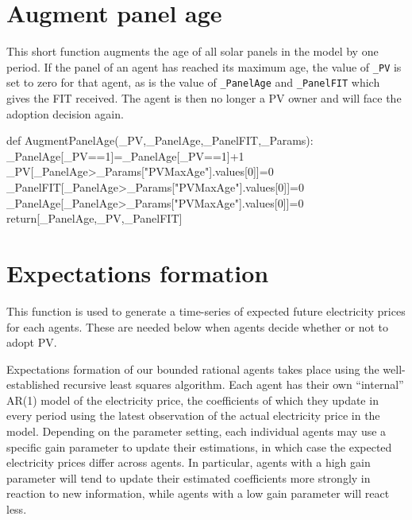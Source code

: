 \documentclass[
  letterpaper,
  DIV=11,
  numbers=noendperiod]{scrartcl}
\newenvironment{Shaded}{\begin{snugshade}}{\end{snugshade}}
\newcommand{\ControlFlowTok}[1]{\textcolor[rgb]{0.00,0.23,0.31}{#1}}
\newcommand{\DecValTok}[1]{\textcolor[rgb]{0.68,0.00,0.00}{#1}}
\newcommand{\KeywordTok}[1]{\textcolor[rgb]{0.00,0.23,0.31}{#1}}
\newcommand{\NormalTok}[1]{\textcolor[rgb]{0.00,0.23,0.31}{#1}}
\newcommand{\OperatorTok}[1]{\textcolor[rgb]{0.37,0.37,0.37}{#1}}
\newcommand{\StringTok}[1]{\textcolor[rgb]{0.13,0.47,0.30}{#1}}
\begin{document}
\hypertarget{augment-panel-age}{%
\section{Augment panel age}\label{augment-panel-age}}

This short function augments the age of all solar panels in the model by
one period. If the panel of an agent has reached its maximum age, the
value of \texttt{\_PV} is set to zero for that agent, as is the value of
\texttt{\_PanelAge} and \texttt{\_PanelFIT} which gives the FIT
received. The agent is then no longer a PV owner and will face the
adoption decision again.

\begin{Shaded}
\begin{Highlighting}[]
\KeywordTok{def}\NormalTok{ AugmentPanelAge(\_PV,\_PanelAge,\_PanelFIT,\_Params):}
\NormalTok{    \_PanelAge[\_PV}\OperatorTok{==}\DecValTok{1}\NormalTok{]}\OperatorTok{=}\NormalTok{\_PanelAge[\_PV}\OperatorTok{==}\DecValTok{1}\NormalTok{]}\OperatorTok{+}\DecValTok{1}
\NormalTok{    \_PV[\_PanelAge}\OperatorTok{\textgreater{}}\NormalTok{\_Params[}\StringTok{"PVMaxAge"}\NormalTok{].values[}\DecValTok{0}\NormalTok{]]}\OperatorTok{=}\DecValTok{0}
\NormalTok{    \_PanelFIT[\_PanelAge}\OperatorTok{\textgreater{}}\NormalTok{\_Params[}\StringTok{"PVMaxAge"}\NormalTok{].values[}\DecValTok{0}\NormalTok{]]}\OperatorTok{=}\DecValTok{0}
\NormalTok{    \_PanelAge[\_PanelAge}\OperatorTok{\textgreater{}}\NormalTok{\_Params[}\StringTok{"PVMaxAge"}\NormalTok{].values[}\DecValTok{0}\NormalTok{]]}\OperatorTok{=}\DecValTok{0}
    \ControlFlowTok{return}\NormalTok{[\_PanelAge,\_PV,\_PanelFIT]}
\end{Highlighting}
\end{Shaded}

\hypertarget{expectations-formation}{%
\section{Expectations formation}\label{expectations-formation}}

This function is used to generate a time-series of expected future
electricity prices for each agents. These are needed below when agents
decide whether or not to adopt PV.

Expectations formation of our bounded rational agents takes place using
the well-established recursive least squares algorithm. Each agent has
their own ``internal'' AR(1) model of the electricity price, the
coefficients of which they update in every period using the latest
observation of the actual electricity price in the model. Depending on
the parameter setting, each individual agents may use a specific gain
parameter to update their estimations, in which case the expected
electricity prices differ across agents. In particular, agents with a
high gain parameter will tend to update their estimated coefficients
more strongly in reaction to new information, while agents with a low
gain parameter will react less.
\end{document}
